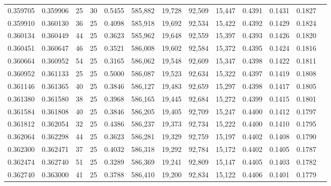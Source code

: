 \begin{tabular}{rrrrrrrrrrrrr}
0.359705 & 0.359906 &    25 &  30 &                                     0.5455 & 585,882 &  19,728 &  92,509 &  15,447 & 0.4391 & 0.1431 & 0.1827 \\
0.359910 & 0.360130 &    36 &  25 &                                     0.4098 & 585,918 &  19,692 &  92,534 &  15,422 & 0.4392 & 0.1429 & 0.1824 \\
0.360134 & 0.360449 &    44 &  25 &                                     0.3623 & 585,962 &  19,648 &  92,559 &  15,397 & 0.4393 & 0.1426 & 0.1820 \\
0.360451 & 0.360647 &    46 &  25 &                                     0.3521 & 586,008 &  19,602 &  92,584 &  15,372 & 0.4395 & 0.1424 & 0.1816 \\
0.360664 & 0.360952 &    54 &  25 &                                     0.3165 & 586,062 &  19,548 &  92,609 &  15,347 & 0.4398 & 0.1422 & 0.1811 \\
0.360952 & 0.361133 &    25 &  25 &                                     0.5000 & 586,087 &  19,523 &  92,634 &  15,322 & 0.4397 & 0.1419 & 0.1808 \\
0.361146 & 0.361365 &    40 &  25 &                                     0.3846 & 586,127 &  19,483 &  92,659 &  15,297 & 0.4398 & 0.1417 & 0.1805 \\
0.361380 & 0.361580 &    38 &  25 &                                     0.3968 & 586,165 &  19,445 &  92,684 &  15,272 & 0.4399 & 0.1415 & 0.1801 \\
0.361584 & 0.361808 &    40 &  25 &                                     0.3846 & 586,205 &  19,405 &  92,709 &  15,247 & 0.4400 & 0.1412 & 0.1797 \\
0.361812 & 0.362054 &    32 &  25 &                                     0.4386 & 586,237 &  19,373 &  92,734 &  15,222 & 0.4400 & 0.1410 & 0.1795 \\
0.362064 & 0.362298 &    44 &  25 &                                     0.3623 & 586,281 &  19,329 &  92,759 &  15,197 & 0.4402 & 0.1408 & 0.1790 \\
0.362300 & 0.362471 &    37 &  25 &                                     0.4032 & 586,318 &  19,292 &  92,784 &  15,172 & 0.4402 & 0.1405 & 0.1787 \\
0.362474 & 0.362740 &    51 &  25 &                                     0.3289 & 586,369 &  19,241 &  92,809 &  15,147 & 0.4405 & 0.1403 & 0.1782 \\
0.362740 & 0.363000 &    41 &  25 &                                     0.3788 & 586,410 &  19,200 &  92,834 &  15,122 & 0.4406 & 0.1401 & 0.1779 \\

\end{tabular}

